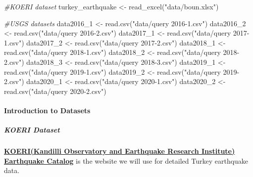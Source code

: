 \documentclass[
]{article}
\newenvironment{Shaded}{\begin{snugshade}}{\end{snugshade}}
\newcommand{\CommentTok}[1]{\textcolor[rgb]{0.56,0.35,0.01}{\textit{#1}}}
\newcommand{\FunctionTok}[1]{\textcolor[rgb]{0.00,0.00,0.00}{#1}}
\newcommand{\NormalTok}[1]{#1}
\newcommand{\OtherTok}[1]{\textcolor[rgb]{0.56,0.35,0.01}{#1}}
\newcommand{\StringTok}[1]{\textcolor[rgb]{0.31,0.60,0.02}{#1}}
\begin{document}
\begin{Shaded}
\begin{Highlighting}[]
\CommentTok{\#KOERI dataset}
\NormalTok{turkey\_earthquake }\OtherTok{\textless{}{-}} \FunctionTok{read\_excel}\NormalTok{(}\StringTok{"data/boun.xlsx"}\NormalTok{)}

\CommentTok{\#USGS datasets}
\NormalTok{data2016\_1 }\OtherTok{\textless{}{-}} \FunctionTok{read.csv}\NormalTok{(}\StringTok{"data/query 2016{-}1.csv"}\NormalTok{)}
\NormalTok{data2016\_2 }\OtherTok{\textless{}{-}} \FunctionTok{read.csv}\NormalTok{(}\StringTok{"data/query 2016{-}2.csv"}\NormalTok{)}
\NormalTok{data2017\_1 }\OtherTok{\textless{}{-}} \FunctionTok{read.csv}\NormalTok{(}\StringTok{"data/query 2017{-}1.csv"}\NormalTok{)}
\NormalTok{data2017\_2 }\OtherTok{\textless{}{-}} \FunctionTok{read.csv}\NormalTok{(}\StringTok{"data/query 2017{-}2.csv"}\NormalTok{)}
\NormalTok{data2018\_1 }\OtherTok{\textless{}{-}} \FunctionTok{read.csv}\NormalTok{(}\StringTok{"data/query 2018{-}1.csv"}\NormalTok{)}
\NormalTok{data2018\_2 }\OtherTok{\textless{}{-}} \FunctionTok{read.csv}\NormalTok{(}\StringTok{"data/query 2018{-}2.csv"}\NormalTok{)}
\NormalTok{data2018\_3 }\OtherTok{\textless{}{-}} \FunctionTok{read.csv}\NormalTok{(}\StringTok{"data/query 2018{-}3.csv"}\NormalTok{)}
\NormalTok{data2019\_1 }\OtherTok{\textless{}{-}} \FunctionTok{read.csv}\NormalTok{(}\StringTok{"data/query 2019{-}1.csv"}\NormalTok{)}
\NormalTok{data2019\_2 }\OtherTok{\textless{}{-}} \FunctionTok{read.csv}\NormalTok{(}\StringTok{"data/query 2019{-}2.csv"}\NormalTok{)}
\NormalTok{data2020\_1 }\OtherTok{\textless{}{-}} \FunctionTok{read.csv}\NormalTok{(}\StringTok{"data/query 2020{-}1.csv"}\NormalTok{)}
\NormalTok{data2020\_2 }\OtherTok{\textless{}{-}} \FunctionTok{read.csv}\NormalTok{(}\StringTok{"data/query 2020{-}2.csv"}\NormalTok{)}
\end{Highlighting}
\end{Shaded}

\hypertarget{introduction-to-datasets}{%
\paragraph{Introduction to Datasets}\label{introduction-to-datasets}}

\hypertarget{koeri-dataset}{%
\subparagraph{KOERI Dataset}\label{koeri-dataset}}

\href{http://www.koeri.boun.edu.tr/sismo/2/earthquake-catalog/}{\textbf{KOERI(Kandilli
Observatory and Earthquake Research Institute) Earthquake Catalog}} is
the website we will use for detailed Turkey earthquake data.
\end{document}
